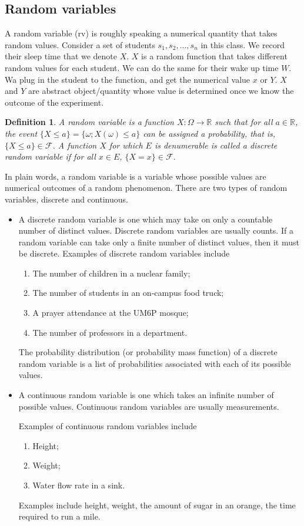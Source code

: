 \documentclass[12pt,a4paper]{article}
\newtheorem{definition}{Definition}
\newcommand{\calF}{\mathcal F}
\newcommand{\R}{\mathbb R}
\begin{document}
  \subsection{Random variables}
  A random variable (rv) is roughly speaking a numerical quantity that takes random values.
  Consider a set of students $s_1, s_2,\ldots, s_n$ in this class. 
  We record their sleep time that we denote $X$. 
  $X$ is a random function that takes different random values for each student.
  We can do the same for their wake up time $W$.
  Wa plug in the student to the function, and get the numerical value $x$ or $Y$.
  $X$ and $Y$ are abstract object/quantity whose value is determined once we know the outcome of the experiment.
  \begin{definition}
  	A random variable is a function $X: \Omega \rightarrow \R$ such that for all $a\in\R$, the event $\{X\leq a\} = \{\omega; X(\omega)\leq a\}$ can be assigned a probability, that is, $\{X\leq a\} \in\calF$.
  	A function $X$ for which $E$ is denumerable is called a discrete random variable if for all $x\in E$, $\{X = x\}\in\calF$.
  	\end{definition}
In plain words, a random variable is a variable whose possible values are numerical outcomes of a random phenomenon. There are two types of random variables, discrete and continuous.
\begin{itemize}
	\item A discrete random variable is one which may take on only a countable number of distinct values. 
	Discrete random variables are usually counts.
	If a random variable can take only a finite number of distinct values, then it must be discrete. 
	Examples of discrete random variables include 
	\begin{enumerate}
	\item The number of children in a nuclear family;
	\item The number of students in an on-campus food truck;
	\item A prayer attendance at the UM6P mosque;
	\item The number of professors in a department.
	\end{enumerate}
	The probability distribution (or probability mass function) of a discrete random variable is a list of probabilities associated with each of its possible values. 
	\item  A continuous random variable is one which takes an infinite number of possible values. Continuous random variables are usually measurements. 
	
	Examples of continuous random variables include 
	\begin{enumerate}
		\item Height;
		\item Weight;
		\item Water flow rate in a sink.
	\end{enumerate}
	Examples include height, weight, the amount of sugar in an orange, the time required to run a mile.
\end{itemize}
\end{document}
